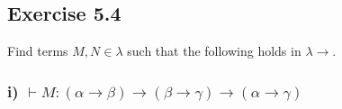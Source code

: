 \documentclass[11pt]{article}
\begin{document}
\subsection*{Exercise 5.4}
Find terms $M,N \in \lambda$ such that the following holds in $\lambda \rightarrow$.
\subsubsection*{i) $\vdash M : (\alpha \rightarrow \beta) \rightarrow (\beta \rightarrow \gamma) \rightarrow (\alpha \rightarrow \gamma)$}
\end{document}
